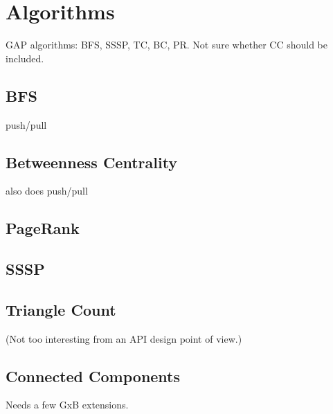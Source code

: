 \section{Algorithms}
\label{sec:algorithms}

GAP algorithms: BFS, SSSP, TC, BC, PR. Not sure whether CC should be included.

\subsection{BFS}

push/pull~\cite{DBLP:conf/icpp/YangBO18}

\subsection{Betweenness Centrality}

also does push/pull

\subsection{PageRank}


\subsection{SSSP}

\subsection{Triangle Count}

(Not too interesting from an API design point of view.)

\subsection{Connected Components}

Needs a few GxB extensions.